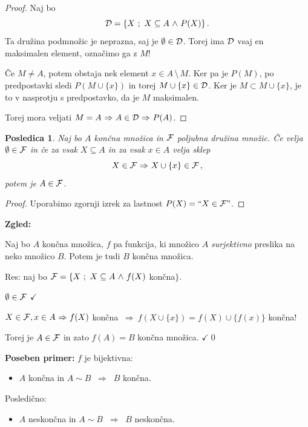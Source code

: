 \documentclass[11pt,paper=b5,DIV=13,headinclude,footinclude]{scrbook}
\def\inn {{~\wedge~}}
\def\sledi {{~\Rightarrow~}}
\def\brez {{\,\setminus\,}}
\newtheorem*{posledica}{Posledica}
\begin{document}
\begin{proof}
Naj bo
$${\cal D} = \{X~;~X\subseteq A \inn P(X)\}\,.$$
Ta družina podmnožic je neprazna, saj je $\emptyset\in {\cal D}$.
Torej ima ${\cal D}$ vsaj en maksimalen element, označimo ga z $M$!

Če $M\neq A$, potem obstaja nek element $x\in A\brez M$. Ker pa je
$P(M)$, po predpostavki sledi $P(M\cup \{x\})$ in torej $M\cup \{x\}\in{\cal D}$.
Ker je $M\subset M\cup \{x\}$, je to v nasprotju s predpostavko, da je $M$ maksimalen.

Torej mora veljati $M = A\sledi A\in {\cal D}\sledi P(A)$.
\end{proof}

\begin{posledica}
Naj bo $A$ končna množica in ${\cal F}$ poljubna družina množic.
Če velja $\emptyset\in {\cal F}$ in če za vsak $X\subseteq A$ in za vsak $x\in A$ velja sklep
$$X\in {\cal F}\sledi X\cup \{x\}\in {\cal F}\,,$$
potem je $A\in {\cal F}$.
\end{posledica}

\begin{proof}
Uporabimo zgornji izrek za lastnost $P(X) = ``X\in {\cal F}"$.
\end{proof}

\textbf{Zgled:}

Naj bo $A$ končna množica, $f$ pa funkcija, ki množico $A$ {\em surjektivno} preslika na neko množico $B$. Potem je tudi $B$ končna množica.

\medskip
Res:  naj bo  ${\cal F} =\{X~;~X\subseteq A \inn f(X)$ končna$\}$.

$\emptyset\in {\cal F}$ $\checkmark$

$X\in {\cal F}, x\in A\sledi f(X)$ končna $\sledi
f(X\cup \{x\}) = f(X) \cup \{f(x)\}$ končna!

Torej je $A\in {\cal F}$ in zato $f(A) = B$ končna množica. $\checkmark$\qed

\bigskip
\textbf{Poseben primer:} $f$ je bijektivna:

\begin{itemize}
\item $A$ končna in $A\sim B$ $\sledi$ $B$ končna.
\end{itemize}

Posledično:
\begin{itemize}
\item $A$ neskončna in $A\sim B$ $\sledi$ $B$ neskončna.
\end{itemize}

\bigskip
\end{document}
